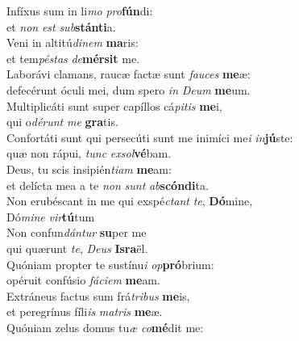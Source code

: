 \evenverse Infíxus sum in li\textit{mo} \textit{pro}\textbf{fún}di:~\*\\
\evenverse et \textit{non} \textit{est} \textit{sub}\textbf{stán}\textbf{ti}a.\\
\oddverse Veni in altitú\textit{di}\textit{nem} \textbf{ma}ris:~\*\\
\oddverse et tem\textit{pé}\textit{stas} \textit{de}\textbf{mér}\textbf{sit} me.\\
\evenverse Laborávi clamans, raucæ factæ sunt \textit{fau}\textit{ces} \textbf{me}æ:~\*\\
\evenverse defecérunt óculi mei, dum spero \textit{in} \textit{De}\textit{um} \textbf{me}um.\\
\oddverse Multiplicáti sunt super capíllos cá\textit{pi}\textit{tis} \textbf{me}i,~\*\\
\oddverse qui o\textit{dé}\textit{runt} \textit{me} \textbf{gra}tis.\\
\evenverse Confortáti sunt qui persecúti sunt me inimíci me\textit{i} \textit{in}\textbf{jú}ste:~\*\\
\evenverse quæ non rápui, \textit{tunc} \textit{ex}\textit{sol}\textbf{vé}bam.\\
\oddverse Deus, tu scis insipién\textit{ti}\textit{am} \textbf{me}am:~\*\\
\oddverse et delícta mea a te \textit{non} \textit{sunt} \textit{ab}\textbf{scón}\textbf{di}ta.\\
\evenverse Non erubéscant in me qui exspé\textit{ctant} \textit{te}, \textbf{Dó}mine,~\*\\
\evenverse Dó\textit{mi}\textit{ne} \textit{vir}\textbf{tú}tum\\
\oddverse Non confun\textit{dán}\textit{tur} \textbf{su}per me~\*\\
\oddverse qui quærunt \textit{te}, \textit{De}\textit{us} \textbf{Is}\textbf{ra}ël.\\
\evenverse Quóniam propter te sustínu\textit{i} \textit{op}\textbf{pró}brium:~\*\\
\evenverse opéruit confúsio \textit{fá}\textit{ci}\textit{em} \textbf{me}am.\\
\oddverse Extráneus factus sum frá\textit{tri}\textit{bus} \textbf{me}is,~\*\\
\oddverse et peregrínus fíli\textit{is} \textit{ma}\textit{tris} \textbf{me}æ.\\
\evenverse Quóniam zelus domus tu\textit{æ} \textit{co}\textbf{mé}dit me:~\*\\
